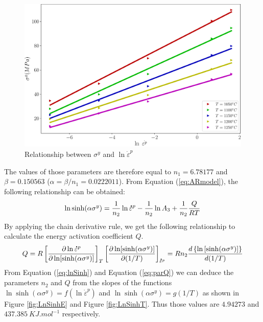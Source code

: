 \documentclass[twoside,english,1p,final,sort&compress]{elsarticle}
\theoremstyle{plain}
\newcommand{\mdot}[1]{\accentset{\mbox{\bfseries .}}{#1}}
\begin{document}
\begin{figure}[!ht]
\centering
\includegraphics[width=0.9\columnwidth]{newFigures/LnSinhE0}
\caption{Relationship between $\sigma^y$ and $\ln \dot{\varepsilon}^p$}
\label{fig:LnSinhE0}
\end{figure}
The values of those parameters are therefore equal to $n_1=6.78177$ and $\beta=0.150563$ ($\alpha=\beta/n_1 = 0.0222011$). 
From Equation (\ref{eq:ARmodel}), the following relationship can be obtained:
\begin{equation}
\label{eq:lnSinh}
\ln\sinh(\alpha\sigma^y) = \frac{1}{n_2}\ln \mdot{\varepsilon}^p  -  \frac{1}{n_2}\ln A_3 + \frac{1}{n_2} \frac{Q}{RT}
\end{equation}
By applying the chain derivative rule, we get the following relationship to calculate the energy activation coefficient $Q$.
\begin{equation}
\label{eq:parQ}
Q = R\left[\frac{\partial \ln \mdot{\varepsilon}^p}{\partial \ln [\sinh(\alpha\sigma^y)]}\right]_{T}\left[\frac{\partial \ln [\sinh(\alpha\sigma^y)]}{\partial (1/T)}\right]_{\mdot{\varepsilon}^p}= Rn_2\frac{d\left\{\ln\left[\sinh(\alpha\sigma^y)\right]\right\}}{d(1/T)}
\end{equation}
From Equation (\ref{eq:lnSinh}) and Equation (\ref{eq:parQ}) we can deduce the parameters $n_2 $ and $Q $ from the slopes of the functions $\ln \sinh(\alpha\sigma^y) = f(\ln \dot{\varepsilon}^p)$ and $\ln \sinh(\alpha\sigma^y) = g(1/T)$ as shown in Figure \ref{fig:LnSinhE} and Figure \ref{fig:LnSinhT}. Thus those values are $4.94273$ and $437.385\ KJ.mol^{-1}$ respectively.
\end{document}
